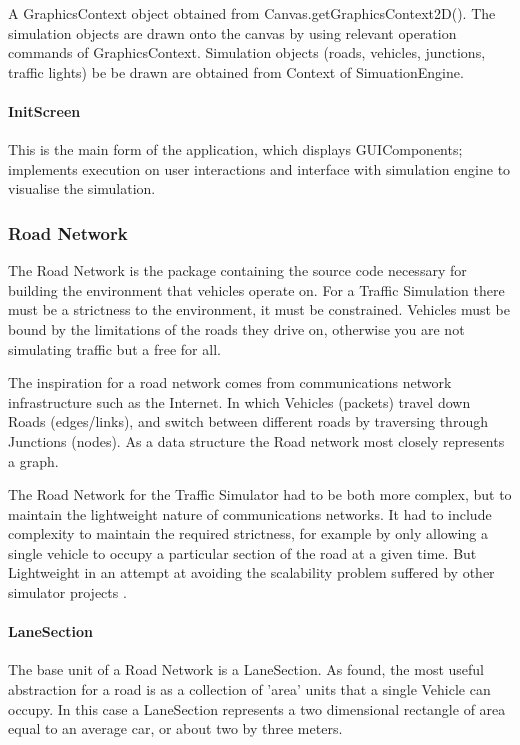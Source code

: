 \documentclass[11pt]{article}
\begin{document}
{\begin{itemize}
    A GraphicsContext object obtained from  Canvas.getGraphicsContext2D(). The simulation objects are drawn onto the canvas by using relevant operation commands of GraphicsContext.
    Simulation objects (roads, vehicles, junctions, traffic lights) be be drawn are obtained from Context of SimuationEngine. 
    
    \paragraph{InitScreen}
    This is the main form of the application, which displays GUIComponents; implements execution on user interactions and  interface with simulation engine to visualise the simulation. 
    
    
\pagebreak
\subsubsection{Road Network}

The Road Network is the package containing the source code necessary for building the environment that vehicles operate on. For a Traffic Simulation there must be a strictness to the environment, it must be constrained. Vehicles must be bound by the limitations of the roads they drive on, otherwise you are not simulating traffic but a free for all.

The inspiration for a road network comes from communications network infrastructure such as the Internet. In which Vehicles (packets) travel down Roads (edges/links), and switch between different roads by traversing through Junctions (nodes). As a data structure the Road network most closely represents a graph.

The Road Network for the Traffic Simulator had to be both more complex, but to maintain the lightweight nature of communications networks. It had to include complexity to maintain the required strictness, for example by only allowing a single vehicle to occupy a particular section of the road at a given time. But Lightweight in an attempt at avoiding the scalability problem suffered by other simulator projects \cite{website:SUMO-SimOfUrbMob}.


    \paragraph{LaneSection}
    
    The base unit of a Road Network is a LaneSection. As \cite{SewWilMer10} found, the most useful abstraction for a road is as a collection of 'area' units that a single Vehicle can occupy. In this case a LaneSection represents a two dimensional rectangle of area equal to an average car, or about two by three meters.
    

\end{itemize}}
\end{document}
